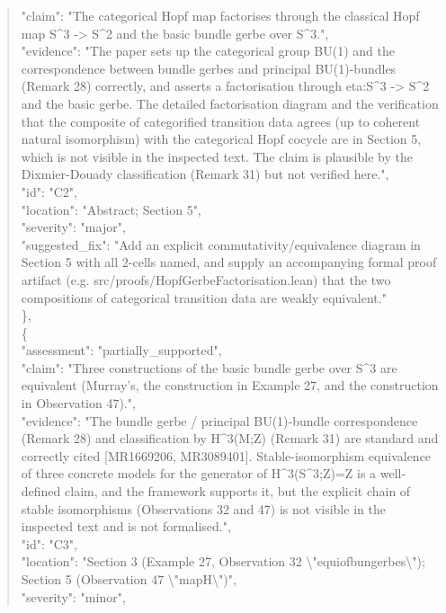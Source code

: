 \documentclass[11pt]{article}
\begin{document}
\begin{quote}
      "claim": "The categorical Hopf map factorises through the classical Hopf map S\^{}3 -> S\^{}2 and the basic bundle gerbe over S\^{}3.",\\
      "evidence": "The paper sets up the categorical group BU(1) and the correspondence between bundle gerbes and principal BU(1)-bundles (Remark 28) correctly, and asserts a factorisation through eta:S\^{}3 -> S\^{}2 and the basic gerbe. The detailed factorisation diagram and the verification that the composite of categorified transition data agrees (up to coherent natural isomorphism) with the categorical Hopf cocycle are in Section 5, which is not visible in the inspected text. The claim is plausible by the Dixmier-Douady classification (Remark 31) but not verified here.",\\
      "id": "C2",\\
      "location": "Abstract; Section 5",\\
      "severity": "major",\\
      "suggested\_fix": "Add an explicit commutativity/equivalence diagram in Section 5 with all 2-cells named, and supply an accompanying formal proof artifact (e.g. src/proofs/HopfGerbeFactorisation.lean) that the two compositions of categorical transition data are weakly equivalent."\\
    \},\\
    \{\\
      "assessment": "partially\_supported",\\
      "claim": "Three constructions of the basic bundle gerbe over S\^{}3 are equivalent (Murray's, the construction in Example 27, and the construction in Observation 47).",\\
      "evidence": "The bundle gerbe / principal BU(1)-bundle correspondence (Remark 28) and classification by H\^{}3(M;Z) (Remark 31) are standard and correctly cited [MR1669206, MR3089401]. Stable-isomorphism equivalence of three concrete models for the generator of H\^{}3(S\^{}3;Z)=Z is a well-defined claim, and the framework supports it, but the explicit chain of stable isomorphisms (Observations 32 and 47) is not visible in the inspected text and is not formalised.",\\
      "id": "C3",\\
      "location": "Section 3 (Example 27, Observation 32 \textbackslash{}"equiofbungerbes\textbackslash{}"); Section 5 (Observation 47 \textbackslash{}"mapH\textbackslash{}")",\\
      "severity": "minor",\\

\end{quote}
\end{document}
